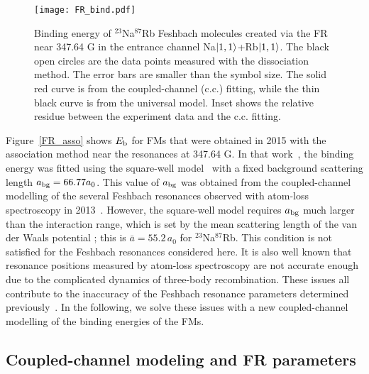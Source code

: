\begin{figure}[htbp]
\begin{center}
\texttt{[image: FR\_bind.pdf]}
\end{center}
\caption[Binding energy of $^{23}$Na$^{87}$Rb Feshbach molecules at 347.64 G]{Binding energy of $^{23}$Na$^{87}$Rb Feshbach molecules created via the FR near 347.64 G in the entrance channel Na$\ket{1,1}$+Rb$\ket{1,1}$. The black open circles are the data points measured with the dissociation method. The error bars are smaller than the symbol size. The solid red curve is from the coupled-channel (c.c.) fitting, while the thin black curve is from the universal model. Inset shows the relative residue between the experiment data and the c.c. fitting.}
\label{FR_bind}
\end{figure}

Figure~\ref{FR_asso} shows $E_{\rm b}$ for FMs that were obtained in 2015 with the association method\cite{wang2015formation} near the resonances at 347.64 G. In that work~\cite{wang2015formation}, the binding energy was fitted using the square-well model~\cite{Lange2009} with a fixed background scattering length $a_{\rm bg} = 66.77a_0$. This value of $a_{\rm bg}$ was obtained from the coupled-channel modelling of the several Feshbach resonances observed with atom-loss spectroscopy in 2013~\cite{wang2013observation}. However, the square-well model requires $a_{\rm bg}$ much larger than the interaction range, which is set by the mean scattering length of the van der Waals potential \cite{Gribakin1993}; this is $\bar{a} = 55.2\,a_0$ for $^{23}$Na$^{87}$Rb. This condition is not satisfied for the Feshbach resonances considered here. It is also well known that resonance positions measured by atom-loss spectroscopy are not accurate enough due to the complicated dynamics of three-body recombination. These issues all contribute to the inaccuracy of the Feshbach resonance parameters determined previously~\cite{wang2015formation}. In the following, we solve these issues with a new coupled-channel modelling of the binding energies of the FMs.

\subsection{Coupled-channel modeling and FR parameters}
\label{sec:cc}

